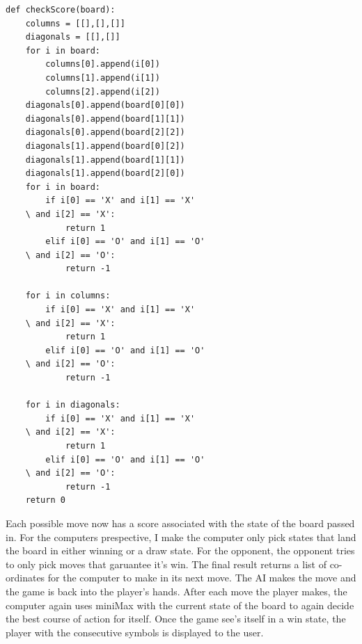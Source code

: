 \documentclass[letterpaper]{article}
\begin{document}
\begin{lstlisting}
def checkScore(board):
    columns = [[],[],[]]
    diagonals = [[],[]]
    for i in board:
        columns[0].append(i[0])
        columns[1].append(i[1])
        columns[2].append(i[2]) 
    diagonals[0].append(board[0][0])
    diagonals[0].append(board[1][1])
    diagonals[0].append(board[2][2])
    diagonals[1].append(board[0][2])
    diagonals[1].append(board[1][1])
    diagonals[1].append(board[2][0])
    for i in board:
        if i[0] == 'X' and i[1] == 'X'
	\ and i[2] == 'X':
            return 1
        elif i[0] == 'O' and i[1] == 'O'
	\ and i[2] == 'O':
            return -1

    for i in columns:
        if i[0] == 'X' and i[1] == 'X'
	\ and i[2] == 'X':
            return 1
        elif i[0] == 'O' and i[1] == 'O' 
	\ and i[2] == 'O':
            return -1

    for i in diagonals:
        if i[0] == 'X' and i[1] == 'X'
	\ and i[2] == 'X':
            return 1
        elif i[0] == 'O' and i[1] == 'O'
	\ and i[2] == 'O':
            return -1
    return 0
\end{lstlisting}
Each possible move now has a score associated with the state of the board passed in. For the computers prespective, I make the computer only pick states that land the board in either winning or a draw state. For the opponent, the opponent tries to only pick moves that garuantee it's win. The final result returns a list of co-ordinates for the computer to make in its next move. The AI makes the move and the game is back into the player's hands. After each move the player makes, the computer again uses miniMax with the current state of the board to again decide the best course of action for itself. Once the game see's itself in a win state, the player with the consecutive symbols is displayed to the user. 
\end{document}
